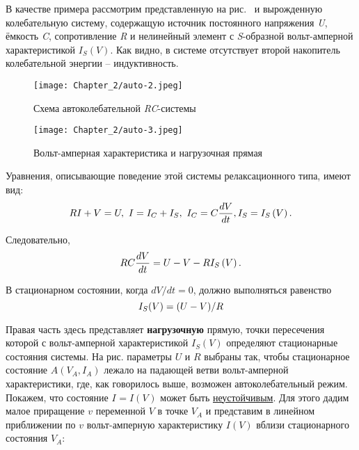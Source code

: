 В качестве примера рассмотрим представленную на рис.~ и  вырожденную колебательную систему, содержащую источник постоянного напряжения \emph{U}, ёмкость \emph{C}, сопротивление \emph{R} и нелинейный элемент с \emph{S}-образной вольт-амперной характеристикой $I_S(V)$. Как видно, в системе отсутствует второй накопитель колебательной энергии -- индуктивность.

\begin{figure}
	\centering
	\texttt{[image: Chapter\_2/auto-2.jpeg]}
	\caption{Схема автоколебательной \emph{RC}-системы}
\end{figure}

\begin{figure}
	\centering
	\texttt{[image: Chapter\_2/auto-3.jpeg]}
	\caption{Вольт-амперная характеристика и нагрузочная прямая}
\end{figure}


Уравнения, описывающие поведение этой системы релаксационного типа,
имеют вид:
\begin{equation} 
	\eqmark{auto-4}
	RI+V=U,~ I=I_C+I_S,~ I_C=C\frac{dV}{dt}, I_S=I_S\left( V \right). 
\end{equation}

Следовательно,
\begin{equation} 
	\eqmark{auto-5}
	RC\frac{dV}{dt}=U-V-R{{I}_{S}}\left( V \right).
\end{equation}

В стационарном состоянии, когда $dV / dt = 0$, должно выполняться равенство
\begin{equation}
	\eqmark{auto-6}
	I_S(V)=(U-V)/R 
\end{equation}

Правая часть здесь представляет \textbf{нагрузочную} прямую, точки пересечения которой с вольт-амперной характеристикой ${{I}_{S}}\left( V \right)$ определяют стационарные состояния системы. На рис.  параметры $U$ и $R$ выбраны так, чтобы стационарное состояние $A(V_A, I_A)$ лежало на падающей ветви вольт-амперной характеристики, где, как говорилось выше, возможен
автоколебательный режим. Покажем, что состояние $I_{\text{}}=I(V_{\text{}})$ может быть \underline{неустойчивым}. Для этого дадим малое приращение $v$ переменной $V$ в точке
$V_A$ и представим в линейном приближении по $v$ вольт-амперную характеристику $I(V)$ вблизи стационарного состояния $V_A$:

